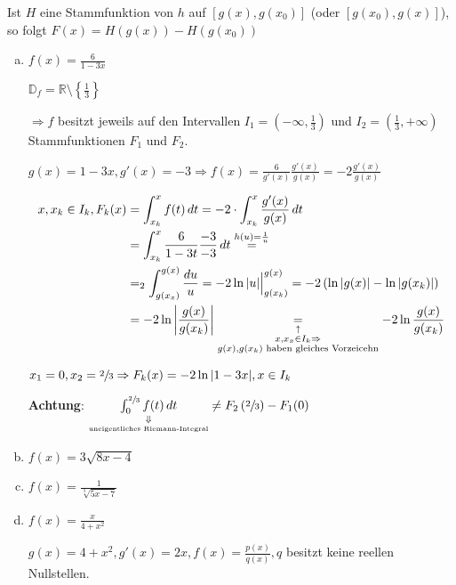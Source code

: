 \documentclass{article}
\begin{document}
Ist $H$ eine Stammfunktion von $h$ auf $[g(x), g(x_0)]$ (oder $[g(x_0), g(x)]$),
so folgt $F(x) = H(g(x)) - H(g(x_0))$
\begin{enumerate}[a)]
\item $f(x) = \frac{6}{1 - 3x}$

  $\mathbb{D}_f = \mathbb{R} \setminus \left\{ \frac{1}{3} \right\}$

  $\Rightarrow f$ besitzt jeweils auf den Intervallen
  $I_1 = \left( -\infty, \frac{1}{3} \right)$ und
  $I_2 = \left( \frac{1}{3}, +\infty \right)$ Stammfunktionen
  $F_1$ und $F_2$.

  $g(x) = 1 - 3x, g'(x) = -3 \Rightarrow f(x) = \frac{6}{g'(x)} \frac{g'(x)}{g(x)}
  = -2 \frac{g'(x)}{g(x)}$

  \begin{align*}
    x, x_k \in I_k, F_k(x) &= \int_{x_k}^x f(t) \,dt = -2 \cdot \int_{x_k}^x \frac{g'(x)}{g(x)} \,dt \\
                           &= \int_{x_k}^x \frac{6}{1 - 3t} \frac{-3}{-3} \,dt
                             \overset{h(u) = \frac{1}{u}}=  \\
                           &= _2 \int_{g(x_x)}^{g(x)} \frac{du}{u} = -2 \ln \abs{u} {\Big |}_{g(x_k)}^{g(x)}
                             = -2 \left( \ln \abs{g(x)} - \ln \abs{g(x_k)} \right) \\
                           &= -2 \ln \abs{\frac{g(x)}{g(x_k)}}
                             \underset{\underset{\substack{x, x_x \in I_k \Rightarrow \\  g(x), g(x_k) \text{ haben gleiches Vorzeicehn}}}\uparrow}=
    -2 \ln \frac{g(x)}{g(x_k)}
  \end{align*}

  $x_1 = 0, x_2 = \sfrac{2}{3} \Rightarrow F_k(x) = -2 \ln \abs{1 - 3x}, x \in I_k$

  \textbf{Achtung}: $\underset{\underset{\text{uneigentliches Riemann-Integral}}\Downarrow}{\int_{0}^{\sfrac{2}{3}} f(t) \,dt} \ne
  F_2\left(\sfrac{2}{3}\right) - F_1 (0)$ 
  
\item $f(x) = 3 \sqrt{8x - 4}$
\item $f(x) = \frac{1}{\sqrt[3]{5x - 7}}$
\item $f(x) = \frac{x}{4 + x^2}$

  $g(x) = 4 + x^2, g'(x) = 2x, f(x) = \frac{p(x)}{q(x)}, q$ besitzt keine reellen Nullstellen.


\end{enumerate}
\end{document}
